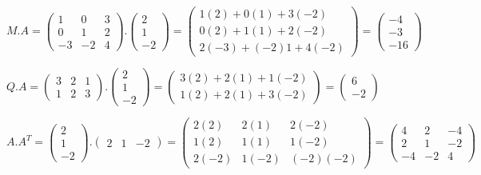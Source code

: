 \documentclass[fleqn]{article}
\begin{document}
\begin{enumerate}
    \bigbreak

    \noindent
    $M.A=
    \begin{pmatrix}
      1 & 0 & 3 \\
      0 & 1 & 2 \\
      -3 & -2 & 4
    \end{pmatrix}
    .
    \begin{pmatrix}
      2  \\
      1  \\
      -2 
    \end{pmatrix}
    =
    \begin{pmatrix}
      1(2)+0(1)+3(-2)  \\
      0(2)+1(1)+2(-2)  \\
      2(-3)+(-2)1+4(-2) 
    \end{pmatrix}
    =
    \begin{pmatrix}
      -4  \\
      -3  \\
      -16 
    \end{pmatrix}
    $

    \noindent
    $Q.A=
    \begin{pmatrix}
      3 & 2 & 1 \\
      1 & 2 & 3
    \end{pmatrix}
    .
    \begin{pmatrix}
      2  \\
      1  \\
      -2 
    \end{pmatrix}
    =
    \begin{pmatrix}
      3(2)+2(1)+1(-2) \\
      1(2)+2(1)+3(-2)
    \end{pmatrix}
    =
    \begin{pmatrix}
      6 \\
      -2
    \end{pmatrix}
    $

    \noindent
    $A.A^T=
    \begin{pmatrix}
      2  \\
      1  \\
      -2 
    \end{pmatrix}
    .
    \begin{pmatrix}
      2 & 1 & -2
    \end{pmatrix}
    =
    \begin{pmatrix}
      2(2) & 2(1) & 2(-2) \\
      1(2) & 1(1) & 1(-2) \\
      2(-2) & 1(-2) & (-2)(-2)
    \end{pmatrix}
    =
    \begin{pmatrix}
      4 & 2 & -4 \\
      2 & 1 & -2 \\
      -4 & -2 & 4
    \end{pmatrix}
    $


\end{enumerate}
\end{document}
